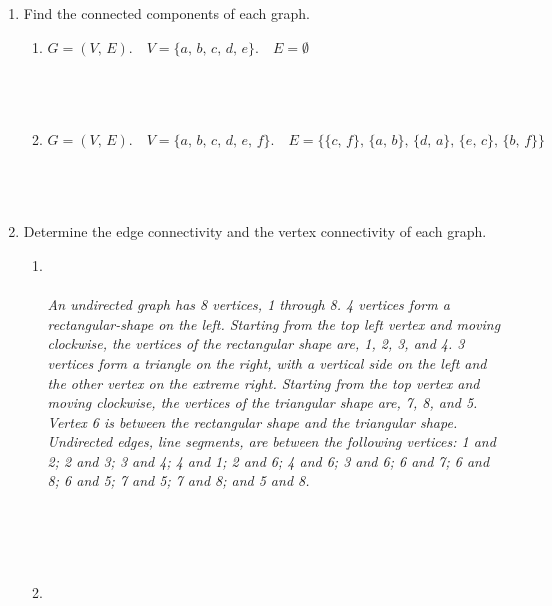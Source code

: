 \documentclass{amsart}
\theoremstyle{definition}
\theoremstyle{Exercise}
\theoremstyle{remark}
\theoremstyle{rule}
\numberwithin{equation}{section}
\begin{document}
\begin{enumerate}[label=(\alph*)]
\item Find the connected components of each graph.\\
    \begin{enumerate}[label=(\roman*)]
    \item $G = (V, \,E).\quad V = \{a,\, b,\, c,\, d,\,  e\}.\quad E = \emptyset$\\\\
\\\\
    \item $G = (V,\, E).\quad V = \{a,\, b,\, c,\, d,\, e,\, f\}.\quad E = \{ \{c,\, f\}, \,\{a,\, b\},\, \{d,\, a\}, \,\{e,\, c\},\, \{b,\, f\} \}$\\\\
\\\\
    \end{enumerate}
\item Determine the edge connectivity and the vertex connectivity of each graph.\\

    \begin{enumerate}[label=(\roman*)]    
 \item
{}
\\\\
{\color{blue}{\bf Figure 7:} \emph{An undirected graph has 8 vertices, 1 through 8. 4 vertices form a rectangular-shape on the left. Starting from the top left vertex and moving clockwise, the vertices of the rectangular shape are, 1, 2, 3, and 4. 3 vertices form a triangle on the right, with a vertical side on the left and the other vertex on the extreme right. Starting from the top vertex and moving clockwise, the vertices of the triangular shape are, 7, 8, and 5. Vertex 6 is between the rectangular shape and the triangular shape. Undirected edges, line segments, are between the following vertices: 1 and 2; 2 and 3; 3 and 4; 4 and 1; 2 and 6; 4 and 6; 3 and 6; 6 and 7; 6 and 8; 6 and 5; 7 and 5; 7 and 8; and 5 and 8.
\\
}
}
\\
\\
\\\\
\newpage
\item  


\end{enumerate}
\end{enumerate}
\end{document}
